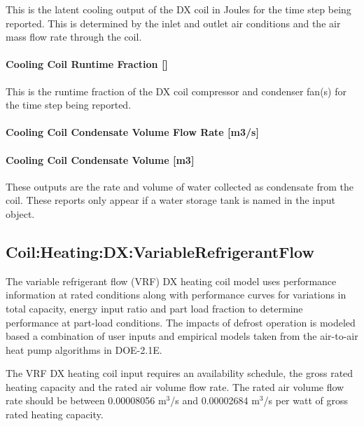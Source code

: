This is the latent cooling output of the DX coil in Joules for the time step being reported. This is determined by the inlet and outlet air conditions and the air mass flow rate through the coil.

\paragraph{\texorpdfstring{Cooling Coil Runtime Fraction {[]}}{Cooling Coil Runtime Fraction }}\label{cooling-coil-runtime-fraction}

This is the runtime fraction of the DX coil compressor and condenser fan(s) for the time step being reported.

\paragraph{Cooling Coil Condensate Volume Flow Rate {[}m3/s{]}}\label{cooling-coil-condensate-volume-flow-rate-m3s-1}

\paragraph{Cooling Coil Condensate Volume {[}m3{]}}\label{cooling-coil-condensate-volume-m3-1}

These outputs are the rate and volume of water collected as condensate from the coil. These reports only appear if a water storage tank is named in the input object.

\subsection{Coil:Heating:DX:VariableRefrigerantFlow}\label{coilheatingdxvariablerefrigerantflow}

The variable refrigerant flow (VRF) DX heating coil model uses performance information at rated conditions along with performance curves for variations in total capacity, energy input ratio and part load fraction to determine performance at part-load conditions. The impacts of defrost operation is modeled based a combination of user inputs and empirical models taken from the air-to-air heat pump algorithms in DOE-2.1E.

The VRF DX heating coil input requires an availability schedule, the gross rated heating capacity and the rated air volume flow rate. The rated air volume flow rate should be between 0.00008056 m\(^{3}\)/s and 0.00002684 m\(^{3}\)/s per watt of gross rated heating capacity.

